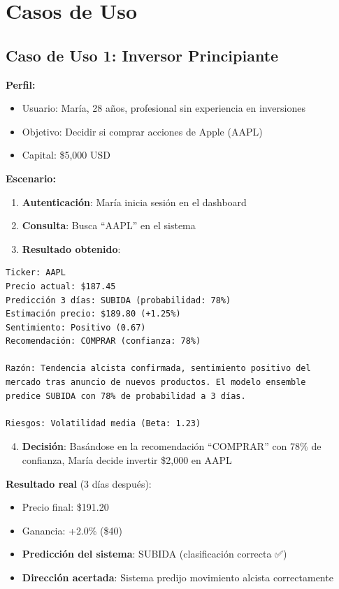 \documentclass[12pt,a4paper]{report}
\begin{document}
\section{Casos de Uso}

\subsection{Caso de Uso 1: Inversor Principiante}

\textbf{Perfil:}
\begin{itemize}
    \item Usuario: María, 28 años, profesional sin experiencia en inversiones
    \item Objetivo: Decidir si comprar acciones de Apple (AAPL)
    \item Capital: \$5,000 USD
\end{itemize}

\textbf{Escenario:}

\begin{enumerate}
    \item \textbf{Autenticación}: María inicia sesión en el dashboard
    \item \textbf{Consulta}: Busca ``AAPL'' en el sistema
    \item \textbf{Resultado obtenido}:
\end{enumerate}

\begin{lstlisting}[language={}]
Ticker: AAPL
Precio actual: $187.45
Predicción 3 días: SUBIDA (probabilidad: 78%)
Estimación precio: $189.80 (+1.25%)
Sentimiento: Positivo (0.67)
Recomendación: COMPRAR (confianza: 78%)

Razón: Tendencia alcista confirmada, sentimiento positivo del
mercado tras anuncio de nuevos productos. El modelo ensemble
predice SUBIDA con 78% de probabilidad a 3 días.

Riesgos: Volatilidad media (Beta: 1.23)
\end{lstlisting}

\begin{enumerate}
    \setcounter{enumi}{3}
    \item \textbf{Decisión}: Basándose en la recomendación ``COMPRAR'' con 78\% de confianza, María decide invertir \$2,000 en AAPL
\end{enumerate}

\textbf{Resultado real} (3 días después):
\begin{itemize}
    \item Precio final: \$191.20
    \item Ganancia: +2.0\% (\$40)
    \item \textbf{Predicción del sistema}: SUBIDA (clasificación correcta ✅)
    \item \textbf{Dirección acertada}: Sistema predijo movimiento alcista correctamente
\end{itemize}
\end{document}

